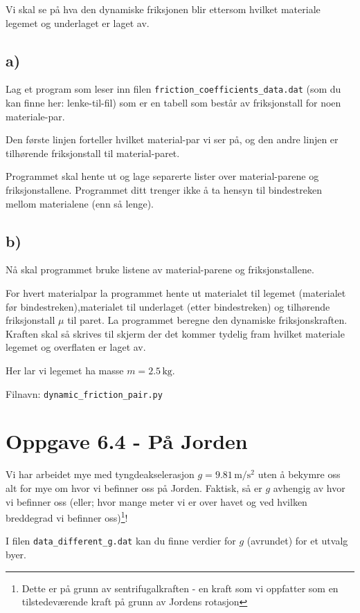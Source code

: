 \documentclass[10pt,a4paper]{article}
\begin{document}
Vi skal se på hva den dynamiske friksjonen blir ettersom hvilket materiale legemet og underlaget er laget av. 
 
\subsection*{a)}
Lag et program som leser inn filen \texttt{friction\_coefficients\_data.dat} (som du kan finne her: lenke-til-fil) som er en tabell som består av friksjonstall for noen materiale-par. 
 
Den første linjen forteller hvilket material-par vi ser på, og den andre linjen er tilhørende friksjonstall til material-paret. 
 
Programmet skal hente ut og lage separerte lister over material-parene og friksjonstallene. Programmet ditt trenger ikke å ta hensyn til bindestreken mellom materialene (enn så lenge). 
 
\subsection*{b)}
Nå skal programmet bruke listene av material-parene og friksjonstallene.
 
For hvert materialpar la programmet hente ut materialet til legemet (materialet før bindestreken),materialet til underlaget (etter bindestreken) og tilhørende friksjonstall $\mu$ til paret. La programmet beregne den dynamiske friksjonskraften. Kraften skal så skrives til skjerm der det kommer tydelig fram hvilket materiale legemet og overflaten er laget av. 
 
Her lar vi legemet ha masse $m = 2.5\,\si{\kg}$.
 
Filnavn: \texttt{dynamic\_friction\_pair.py}
 
\section*{Oppgave 6.4 - På Jorden}
Vi har arbeidet mye med tyngdeakselerasjon  $g = 9.81\,\mathrm{m/s^2}$ uten å bekymre oss alt for mye om hvor vi befinner oss på Jorden. Faktisk, så er $g$ avhengig av hvor vi befinner oss (eller; hvor mange meter vi er over havet og ved hvilken breddegrad vi befinner oss)\footnote{Dette er på grunn av sentrifugalkraften - en kraft som vi oppfatter som en tilstedeværende kraft på grunn av Jordens rotasjon}!

I filen  \texttt{data\_different\_g.dat} kan du finne verdier for $g$ (avrundet) for et utvalg byer. 
\end{document}
